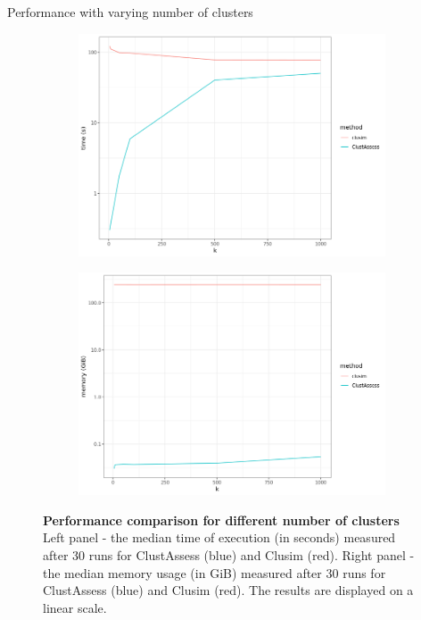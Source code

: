 \begin{frame}{Performance with varying number of clusters}
    \begin{figure}
        \centering
        \begin{subfigure}[t]{0.47\textwidth}
            \includegraphics[width=\textwidth]{images/ch4/4_clusim_ca_time_k.png}
        \end{subfigure}
        \begin{subfigure}[b]{0.47\textwidth}
            \includegraphics[width=\textwidth]{images/ch4/4_clusim_ca_memory_k.png}
        \end{subfigure}
        \caption{\textbf{Performance comparison for different number of clusters} Left panel - the median time of execution (in seconds) measured after 30 runs for ClustAssess (blue) and Clusim (red). Right panel - the median memory usage (in GiB) measured after 30 runs for ClustAssess (blue) and Clusim (red). The results are displayed on a linear scale.}
    \end{figure}
\end{frame}

